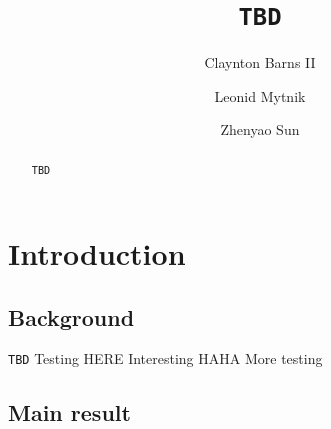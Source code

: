 \documentclass[12pt,a4paper]{amsart}
\numberwithin{equation}{section}
\theoremstyle{plain}
\theoremstyle{remark}
\begin{document}
	\title[]{{\tt TBD}}
	\author[]{Claynton Barns II}
	\address{{\tt TBD}}
	\author[]{Leonid Mytnik}
	\address{{\tt TBD}}
	\author[]{Zhenyao Sun}
	\address{{\tt TBD}}
\begin{abstract}
	{\tt TBD}
\end{abstract}
\maketitle
	
\section{Introduction}
\subsection{Background} 
    {\tt TBD}
    {Testing HERE}
    {Interesting HAHA}
    {More testing}
\subsection{Main result} \label{sec:M} 
\end{document}
